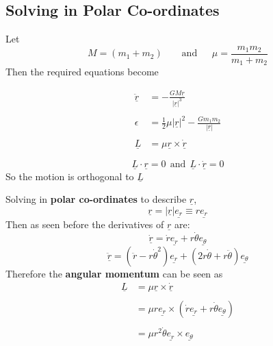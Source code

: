 
\subsection{Solving in Polar Co-ordinates}

Let
$$M = (m_{1} + m_{2}) \ \ \ \ \ \ \ \ \ \text{and} \ \ \ \ \ \ \ \mu = \frac{m_{1}m_{2}}{m_{1} + m_{2}}$$
Then the required equations become

$$
	\begin{aligned}
		\underline{\ddot{r}} & = -\frac{GM\underline{r}}{|\underline{r}|^{3}}                             \\ \\
		\epsilon             & = \frac{1}{2}\mu|\underline{r}|^{2}  - \frac{Gm_{1}m_{2}}{|\underline{r}|} \\ \\
		\underline{L}        & = \mu\underline{r} \times \underline{\dot{r}}
	\end{aligned}
$$
\begin{note}
	$$\underline{L} \cdot \underline{r} = 0  \ \ \text{and} \ \ \underline{L} \cdot \underline{\dot{r}} = 0$$
	So the motion is orthogonal to $\underline{L}$
\end{note}

Solving in {\bf polar co-ordinates} to describe $\underline{r}$,
$$\underline{r} = |\underline{r}|\underline{e_{r}} \equiv r\underline{e_{r}}$$
Then as seen before the derivatives of $\underline{r}$ are:
$$\underline{\dot{r}} = \dot{r}\underline{e_{r}} + r\dot{\theta}\underline{e_{\theta}}$$
$$\underline{\ddot{r}} = (\ddot{r} - r\dot{\theta}^{2})\underline{e_{r}} + (2r\dot{\theta} + r\ddot{\theta})\underline{e_{\theta}}$$
\clearpage
Therefore the {\bf angular momentum} can be seen as
$$
	\begin{aligned}
		\underline{L} & = \mu\underline{r} \times \underline{\dot{r}}                                                    \\ \\
		              & = \mu r\underline{e_{r}} \times (\dot{r}\underline{e_{r}} + r\dot{\theta}\underline{e_{\theta}}) \\ \\
		              & = \mu r^{2}\dot{\theta} \underline{e_{r}} \times \underline{e_{\theta}}
	\end{aligned}
$$

